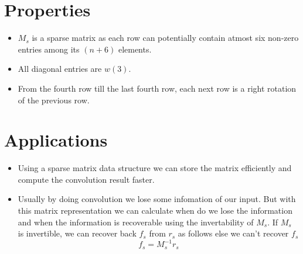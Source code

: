 \documentclass[a4paper,landscape]{article}
\begin{document}
\section{Properties}
\begin{itemize}
    \item $M_s$ is a sparse matrix as each row can potentially contain atmost six non-zero entries among its $(n+6)$ elements.
    \item All diagonal entries are $w(3)$.
    \item From the fourth row till the last fourth row, each next row is a right rotation of the previous row.
\end{itemize}
\section{Applications}
\begin{itemize}
    \item Using a sparse matrix data structure we can store the matrix efficiently and compute the convolution result faster.
    \item Usually by doing convolution we lose some infomation of our input. But  with  this matrix representation we can calculate when do we lose the information and when the information is recoverable using the invertability of $M_s$. If $M_s$ is invertible, we can recover back $f_s$ from $r_s$ as follows else we can't recover $f_s$
\[f_s=M_s^{-1}r_s\]
\end{itemize}
\end{document}
